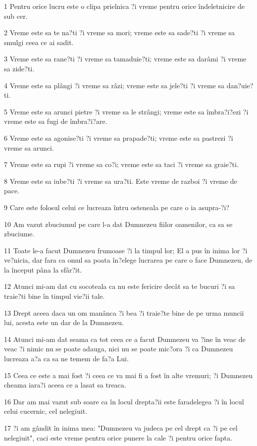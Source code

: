 \par 1 Pentru orice lucru este o clipa prielnica ?i vreme pentru orice îndeletnicire de sub cer.
\par 2 Vreme este sa te na?ti ?i vreme sa mori; vreme este sa sade?ti ?i vreme sa smulgi ceea ce ai sadit.
\par 3 Vreme este sa rane?ti ?i vreme sa tamaduie?ti; vreme este sa darâmi ?i vreme sa zide?ti.
\par 4 Vreme este sa plângi ?i vreme sa râzi; vreme este sa jele?ti ?i vreme sa dan?uie?ti.
\par 5 Vreme este sa arunci pietre ?i vreme sa le strângi; vreme este sa îmbra?i?ezi ?i vreme este sa fugi de îmbra?i?are.
\par 6 Vreme este sa agonise?ti ?i vreme sa prapade?ti; vreme este sa pastrezi ?i vreme sa arunci.
\par 7 Vreme este sa rupi ?i vreme sa co?i; vreme este sa taci ?i vreme sa graie?ti.
\par 8 Vreme este sa iube?ti ?i vreme sa ura?ti. Este vreme de razboi ?i vreme de pace.
\par 9 Care este folosul celui ce lucreaza întru osteneala pe care o ia asupra-?i?
\par 10 Am vazut zbuciumul pe care l-a dat Dumnezeu fiilor oamenilor, ca sa se zbuciume.
\par 11 Toate le-a facut Dumnezeu frumoase ?i la timpul lor; El a pus în inima lor ?i ve?nicia, dar fara ca omul sa poata în?elege lucrarea pe care o face Dumnezeu, de la început pâna la sfâr?it.
\par 12 Atunci mi-am dat cu socoteala ca nu este fericire decât sa te bucuri ?i sa traie?ti bine în timpul vie?ii tale.
\par 13 Drept aceea daca un om manânca ?i bea ?i traie?te bine de pe urma muncii lui, acesta este un dar de la Dumnezeu.
\par 14 Atunci mi-am dat seama ca tot ceea ce a facut Dumnezeu va ?ine în veac de veac ?i nimic nu se poate adauga, nici nu se poate mic?ora ?i ca Dumnezeu lucreaza a?a ca sa ne temem de fa?a Lui.
\par 15 Ceea ce este a mai fost ?i ceea ce va mai fi a fost în alte vremuri; ?i Dumnezeu cheama iara?i aceea ce a lasat sa treaca.
\par 16 Dar am mai vazut sub soare ca în locul drepta?ii este faradelegea ?i în locul celui cucernic, cel nelegiuit.
\par 17 ?i am gândit în inima mea: "Dumnezeu va judeca pe cel drept ca ?i pe cel nelegiuit", caci este vreme pentru orice punere la cale ?i pentru orice fapta.
